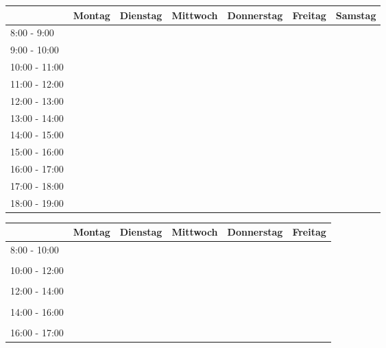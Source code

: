 \documentclass[landscape]{article}
\theoremstyle{definition} %
\begin{document}
  \begin{center}
    \begin{tabular}{|p{2cm}|p{3.5cm}|p{3.5cm}|p{3.5cm}|p{3.5cm}|p{3.5cm}|p{3.5cm}|} 
      \hline
      & Montag & Dienstag & Mittwoch & Donnerstag & Freitag & Samstag \\ 
      \hline
      8:00 - 9:00 & & & & & &\\ 
      \hline
      9:00 - 10:00 & & & & & & \\ 
      \hline
      10:00 - 11:00 & & & & & & \\ 
      \hline
      11:00 - 12:00 & & & & & & \\ 
      \hline
      12:00 - 13:00 & & & & & &\\ 
      \hline
      13:00 - 14:00 & & & & & &\\ 
      \hline
      14:00 - 15:00 & & & & & &\\ 
      \hline
      15:00 - 16:00 & & & & & &\\ 
      \hline
      16:00 - 17:00 & & & & & &\\ 
      \hline
      17:00 - 18:00 & & & & & &\\ 
      \hline
      18:00 - 19:00 & & & & & &\\
      \hline
    \end{tabular}
  \end{center}
  \begin{center}
    \begin{tabular}{|p{2.5cm}|p{4cm}|p{4cm}|p{4cm}|p{4cm}|p{4cm}|} 
      \hline
      & Montag & Dienstag & Mittwoch & Donnerstag & Freitag \\ 
      \hline
      8:00 - 10:00 & & & & & \\ 
      & & & & & \\ 
      \hline
      10:00 - 12:00 & & & & & \\ 
      & & & & & \\ 
      \hline
      12:00 - 14:00 & & & & & \\ 
      & & & & & \\ 
      \hline
      14:00 - 16:00 & & & & & \\ 
      & & & & & \\ 
      \hline
      16:00 - 17:00 & & & & & \\ 
      \hline
    \end{tabular}
  \end{center}
\end{document}
